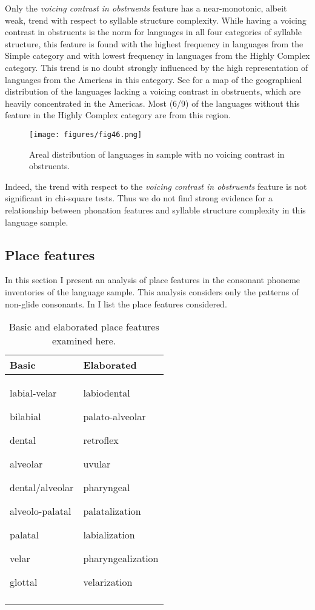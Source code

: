   Only the \textit{voicing contrast in obstruents} feature has a near-monotonic, albeit weak, trend with respect to syllable structure complexity. While having a voicing contrast in obstruents is the norm for languages in all four categories of syllable structure, this feature is found with the highest frequency in languages from the Simple category and with lowest frequency in languages from the Highly Complex category. This trend is no doubt strongly influenced by the high representation of languages from the Americas in this category. See  for a map of the geographical distribution of the languages lacking a voicing contrast in obstruents, which are heavily concentrated in the Americas. Most (6/9) of the languages without this feature in the Highly Complex category are from this region.

  
\begin{figure}
\texttt{[image: figures/fig46.png]}
\caption{\label{fig:4.6}Areal distribution of languages in sample with no voicing contrast in obstruents.}
\end{figure}

  Indeed, the trend with respect to the \textit{voicing contrast in obstruents} feature is not significant in chi-square tests. Thus we do not find strong evidence for a relationship between phonation features and syllable structure complexity in this language sample.

\subsection{Place features}\label{sec:4.4.4}

  In this section I present an analysis of place features in the consonant phoneme inventories of the language sample. This analysis considers only the patterns of non-glide consonants. In  I list the place features considered.

\begin{table}[t]
\begin{tabularx}{\textwidth}{QQ}
\lsptoprule
Basic & Elaborated\\\midrule
labial-velar

bilabial

dental

alveolar

dental/alveolar

alveolo-palatal

palatal

velar

glottal & labiodental

palato-alveolar

retroflex

uvular

pharyngeal

palatalization

labialization

pharyngealization

velarization\\
\lspbottomrule
\end{tabularx}
\caption{\label{tab:4.13}Basic and elaborated place features examined here.}
\end{table}

